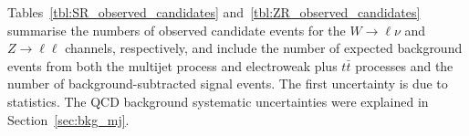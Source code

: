 Tables~\ref{tbl:SR_observed_candidates} and~\ref{tbl:ZR_observed_candidates} summarise the numbers of observed candidate events for the $W \rightarrow \ell\nu$ and $Z \rightarrow \ell\ell$ channels, respectively, and include the number of expected background events from both the multijet process and electroweak plus $t\bar{t}$ processes and the number of background-subtracted signal events. 
The first uncertainty is due to statistics. 
The QCD background systematic uncertainties were explained in Section~\ref{sec:bkg_mj}. 



